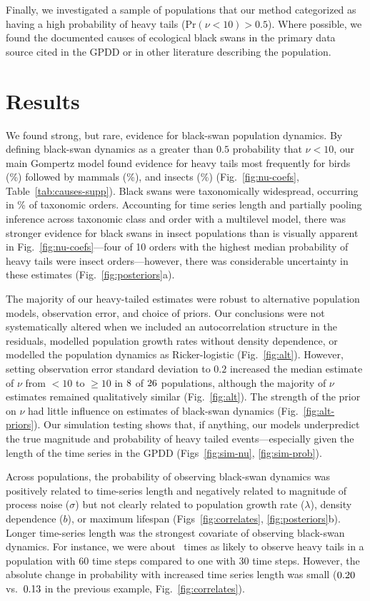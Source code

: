 Finally, we investigated a sample of populations that our method categorized as
having a high probability of heavy tails (Pr$(\nu < 10) > 0.5$). Where
possible, we found the documented causes of ecological black swans in the
primary data source cited in the GPDD or in other literature describing the
population.

\section{Results}

We found strong, but rare, evidence for black-swan population dynamics. By
defining black-swan dynamics as a greater than $0.5$ probability that $\nu <
10$, our main Gompertz model found evidence for heavy tails most frequently
for birds (\birdPH\%) followed by mammals (\mammalsPH\%), and insects
(\insectsPH\%) (Fig.~\ref{fig:nu-coefs}, Table~\ref{tab:causes-supp}). Black
swans were taxonomically widespread, occurring in \POrdersHeavy\% of taxonomic
orders. Accounting for time series length and partially pooling inference
across taxonomic class and order with a multilevel model, there was stronger
evidence for black swans in insect populations than is visually apparent in
Fig.~\ref{fig:nu-coefs}---four of 10 orders with the highest median
probability of heavy tails were insect orders---however, there was
considerable uncertainty in these estimates (Fig.~\ref{fig:posteriors}a).

The majority of our heavy-tailed estimates were robust to alternative
population models, observation error, and choice of priors. Our conclusions
were not systematically altered when we included an autocorrelation structure
in the residuals, modelled population growth rates without density dependence,
or modelled the population dynamics as Ricker-logistic (Fig.~\ref{fig:alt}).
However, setting observation error standard deviation to $0.2$ increased the
median estimate of $\nu$ from $<10$ to $\ge 10$ in $8$ of
$26$ populations, although the majority of $\nu$ estimates remained
qualitatively similar (Fig.~\ref{fig:alt}). The strength of the prior on $\nu$
had little influence on estimates of black-swan dynamics
(Fig.~\ref{fig:alt-priors}). Our simulation testing shows that, if anything,
our models underpredict the true magnitude and probability of heavy tailed
events---especially given the length of the time series in the GPDD
(Figs~\ref{fig:sim-nu}, \ref{fig:sim-prob}).

Across populations, the probability of observing black-swan dynamics was
positively related to time-series length and negatively related to magnitude of
process noise ($\sigma$) but not clearly related to population growth rate
($\lambda$), density dependence ($b$), or maximum lifespan
(Figs~\ref{fig:correlates}, \ref{fig:posteriors}b). Longer time-series length
was the strongest covariate of observing black-swan dynamics. For instance, we
were about \pIncHeavyNThirtyNSixty~times as likely to observe heavy tails in a
population with 60 time steps compared to one with 30 time steps. However, the
absolute change in probability with increased time series length was small
($0.20$ vs.\ $0.13$ in the previous example,
Fig.~\ref{fig:correlates}).

